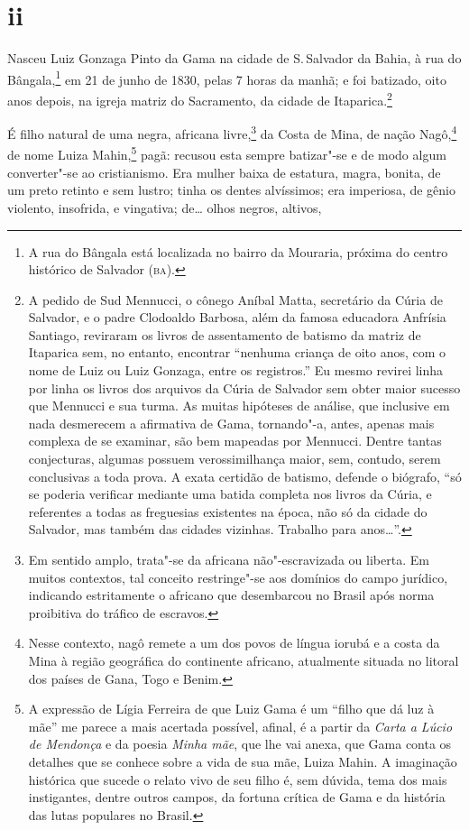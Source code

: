 \section*{ii}

Nasceu Luiz Gonzaga Pinto da Gama na cidade de S.\,Salvador da Bahia, à
rua do Bângala,\footnote{A rua do Bângala está localizada no bairro da
  Mouraria, próxima do centro histórico de Salvador (\textsc{ba}).} em 21 de
junho de 1830, pelas 7 horas da manhã; e foi batizado, oito anos depois,
na igreja matriz do Sacramento, da cidade de Itaparica.\footnote{A
  pedido de Sud Mennucci, o cônego Aníbal Matta, secretário da Cúria de
  Salvador, e o padre Clodoaldo Barbosa, além da famosa educadora
  Anfrísia Santiago, reviraram os livros de assentamento de batismo da
  matriz de Itaparica sem, no entanto, encontrar ``nenhuma criança de
  oito anos, com o nome de Luiz ou Luiz Gonzaga, entre os registros.'' Eu
  mesmo revirei linha por linha os livros dos arquivos da Cúria de
  Salvador sem obter maior sucesso que Mennucci e sua turma. As muitas
  hipóteses de análise, que inclusive em nada desmerecem a afirmativa de
  Gama, tornando"-a, antes, apenas mais complexa de se examinar, são bem
  mapeadas por Mennucci. Dentre tantas conjecturas, algumas possuem
  verossimilhança maior, sem, contudo, serem conclusivas a toda prova. A
  exata certidão de batismo, defende o biógrafo, ``só se poderia
  verificar mediante uma batida completa nos livros da Cúria, e
  referentes a todas as freguesias existentes na época, não só da cidade
  do Salvador, mas também das cidades vizinhas. Trabalho para anos\ldots{}''.}

É filho natural de uma negra, africana livre,\footnote{Em sentido
  amplo, trata"-se da africana não"-escravizada ou liberta. Em muitos
  contextos, tal conceito restringe"-se aos domínios do campo jurídico,
  indicando estritamente o africano que desembarcou no Brasil após norma
  proibitiva do tráfico de escravos.} da Costa de Mina, de nação
Nagô,\footnote{Nesse contexto, nagô remete a um dos povos de língua
  iorubá e a costa da Mina à região geográfica do continente africano,
  atualmente situada no litoral dos países de Gana, Togo e Benim.} de
nome Luiza Mahin,\footnote{A expressão de Lígia Ferreira de que Luiz
  Gama é um ``filho que dá luz à mãe'' me parece a mais acertada possível,
  afinal, é a partir da \emph{Carta a Lúcio de Mendonça} e da poesia
  \emph{Minha mãe}, que lhe vai anexa, que Gama conta os detalhes que
  se conhece sobre a vida de sua mãe, Luiza Mahin. A imaginação histórica
  que sucede o relato vivo de seu filho é, sem dúvida, tema dos mais
  instigantes, dentre outros campos, da fortuna crítica de Gama e da
  história das lutas populares no Brasil.} pagã: recusou esta sempre
batizar"-se e de modo algum converter"-se ao cristianismo. Era mulher
baixa de estatura, magra, bonita, de um preto retinto e sem lustro;
tinha os dentes alvíssimos; era imperiosa, de gênio violento, insofrida,
e vingativa; de\ldots{} olhos negros, altivos,


